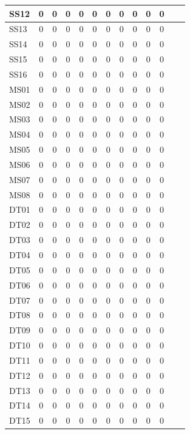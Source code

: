 \documentclass [10pt]{article}
\begin{document}
\begin{longtable}{ | p{}  | c | c | c | c | c | c | c | c | c | c | c | c | }
	SS12 & 0 & 0 & 0 & 0 & 0 & 0 & 0 & 0 & 0 & 0 \\ \hline
	SS13 & 0 & 0 & 0 & 0 & 0 & 0 & 0 & 0 & 0 & 0 \\ \hline
	SS14 & 0 & 0 & 0 & 0 & 0 & 0 & 0 & 0 & 0 & 0 \\ \hline
	SS15 & 0 & 0 & 0 & 0 & 0 & 0 & 0 & 0 & 0 & 0 \\ \hline
	SS16 & 0 & 0 & 0 & 0 & 0 & 0 & 0 & 0 & 0 & 0 \\ \hline
	MS01 & 0 & 0 & 0 & 0 & 0 & 0 & 0 & 0 & 0 & 0 \\ \hline
	MS02 & 0 & 0 & 0 & 0 & 0 & 0 & 0 & 0 & 0 & 0 \\ \hline
	MS03 & 0 & 0 & 0 & 0 & 0 & 0 & 0 & 0 & 0 & 0 \\ \hline
	MS04 & 0 & 0 & 0 & 0 & 0 & 0 & 0 & 0 & 0 & 0 \\ \hline
	MS05 & 0 & 0 & 0 & 0 & 0 & 0 & 0 & 0 & 0 & 0 \\ \hline
	MS06 & 0 & 0 & 0 & 0 & 0 & 0 & 0 & 0 & 0 & 0 \\ \hline
	MS07 & 0 & 0 & 0 & 0 & 0 & 0 & 0 & 0 & 0 & 0 \\ \hline
	MS08 & 0 & 0 & 0 & 0 & 0 & 0 & 0 & 0 & 0 & 0 \\ \hline
	DT01 & 0 & 0 & 0 & 0 & 0 & 0 & 0 & 0 & 0 & 0 \\ \hline
	DT02 & 0 & 0 & 0 & 0 & 0 & 0 & 0 & 0 & 0 & 0 \\ \hline
	DT03 & 0 & 0 & 0 & 0 & 0 & 0 & 0 & 0 & 0 & 0 \\ \hline
	DT04 & 0 & 0 & 0 & 0 & 0 & 0 & 0 & 0 & 0 & 0 \\ \hline
	DT05 & 0 & 0 & 0 & 0 & 0 & 0 & 0 & 0 & 0 & 0 \\ \hline
	DT06 & 0 & 0 & 0 & 0 & 0 & 0 & 0 & 0 & 0 & 0 \\ \hline
	DT07 & 0 & 0 & 0 & 0 & 0 & 0 & 0 & 0 & 0 & 0 \\ \hline
	DT08 & 0 & 0 & 0 & 0 & 0 & 0 & 0 & 0 & 0 & 0 \\ \hline
	DT09 & 0 & 0 & 0 & 0 & 0 & 0 & 0 & 0 & 0 & 0 \\ \hline
	DT10 & 0 & 0 & 0 & 0 & 0 & 0 & 0 & 0 & 0 & 0 \\ \hline
	DT11 & 0 & 0 & 0 & 0 & 0 & 0 & 0 & 0 & 0 & 0 \\ \hline
	DT12 & 0 & 0 & 0 & 0 & 0 & 0 & 0 & 0 & 0 & 0 \\ \hline
	DT13 & 0 & 0 & 0 & 0 & 0 & 0 & 0 & 0 & 0 & 0 \\ \hline
	DT14 & 0 & 0 & 0 & 0 & 0 & 0 & 0 & 0 & 0 & 0 \\ \hline
	DT15 & 0 & 0 & 0 & 0 & 0 & 0 & 0 & 0 & 0 & 0 \\ \hline

\end{longtable}
\end{document}
